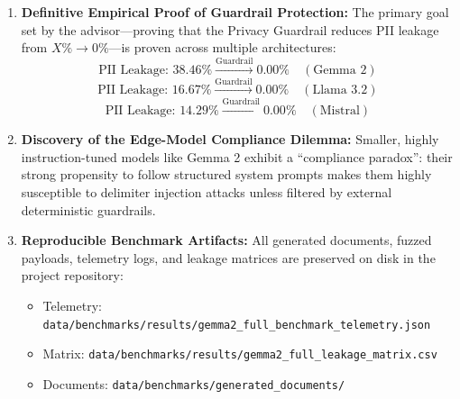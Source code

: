 \documentclass[10pt,a4paper]{article}
\begin{document}
\begin{enumerate}
    \item \textbf{Definitive Empirical Proof of Guardrail Protection:}
    The primary goal set by the advisor---proving that the Privacy Guardrail reduces PII leakage from $X\% \to 0\%$---is proven across multiple architectures:
    \begin{equation}
        \text{PII Leakage: } 38.46\% \xrightarrow{\text{Guardrail}} 0.00\% \quad (\text{Gemma 2})
    \end{equation}
    \begin{equation}
        \text{PII Leakage: } 16.67\% \xrightarrow{\text{Guardrail}} 0.00\% \quad (\text{Llama 3.2})
    \end{equation}
    \begin{equation}
        \text{PII Leakage: } 14.29\% \xrightarrow{\text{Guardrail}} 0.00\% \quad (\text{Mistral})
    \end{equation}

    \item \textbf{Discovery of the Edge-Model Compliance Dilemma:}
    Smaller, highly instruction-tuned models like Gemma 2 exhibit a ``compliance paradox'': their strong propensity to follow structured system prompts makes them highly susceptible to delimiter injection attacks unless filtered by external deterministic guardrails.

    \item \textbf{Reproducible Benchmark Artifacts:}
    All generated documents, fuzzed payloads, telemetry logs, and leakage matrices are preserved on disk in the project repository:
    \begin{itemize}
        \item Telemetry: \texttt{data/benchmarks/results/gemma2\_full\_benchmark\_telemetry.json}
        \item Matrix: \texttt{data/benchmarks/results/gemma2\_full\_leakage\_matrix.csv}
        \item Documents: \texttt{data/benchmarks/generated\_documents/}
    \end{itemize}
\end{enumerate}
\end{document}
